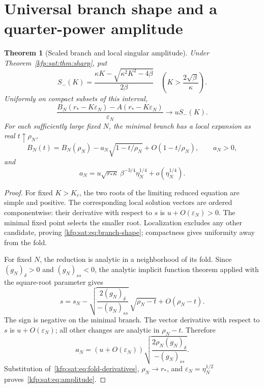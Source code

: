 \documentclass[11pt,a4paper]{article}
\newtheorem{theorem}{Theorem}[section]
\theoremstyle{definition}
\theoremstyle{remark}
\begin{document}
\section{Universal branch shape and a quarter-power amplitude}
\label{kfp:sat:sec:branch}

\begin{theorem}[Scaled branch and local singular amplitude]\label{kfp:sat:thm:branch}
Under Theorem~\ref{kfp:sat:thm:sharp}, put
\[
 S_-(K)=\frac{\kappa K-\sqrt{\kappa^2K^2-4\beta}}{2\beta}
 \quad\left(K>\frac{2\sqrt\beta}{\kappa}\right).
\]
Uniformly on compact subsets of this interval,
\begin{equation}\label{kfp:sat:eq:branch-shape}
 \frac{B_N(r_*-K\varepsilon_N)-A(r_*-K\varepsilon_N)}{\varepsilon_N}
 \longrightarrow uS_-(K).
\end{equation}
For each sufficiently large fixed $N$, the minimal branch has a local
expansion as real $t\uparrow\rho_N$,
\begin{equation}\label{kfp:sat:eq:local-sqrt}
 B_N(t)=B_N(\rho_N)-a_N\sqrt{1-t/\rho_N}
                  +O(1-t/\rho_N),\qquad a_N>0,
\end{equation}
and
\begin{equation}\label{kfp:sat:eq:amplitude}
 \boxed{\displaystyle
 a_N=u\sqrt{r_*\kappa}\,\beta^{-3/4}\eta_N^{1/4}
       +o(\eta_N^{1/4}).}
\end{equation}
\end{theorem}
\begin{proof}
For fixed $K>K_c$, the two roots of the limiting reduced equation are
simple and positive. The corresponding local solution vectors are ordered
componentwise: their derivative with respect to $s$ is
$u+O(\varepsilon_N)>0$. The minimal fixed point selects the smaller
root. Localization excludes any other candidate, proving
\eqref{kfp:sat:eq:branch-shape}; compactness gives uniformity away from the fold.

For fixed $N$, the reduction is analytic in a neighborhood of its fold.
Since $(g_N)_\delta>0$ and $(g_N)_{ss}<0$, the analytic implicit function
theorem applied with the square-root parameter gives
\[
 s=s_N-
 \sqrt{\frac{2(g_N)_\delta}{-(g_N)_{ss}}}\,
        \sqrt{\rho_N-t}+O(\rho_N-t).
\]
The sign is negative on the minimal branch. The vector derivative with
respect to $s$ is $u+O(\varepsilon_N)$; all other changes are analytic in
$\rho_N-t$. Therefore
\[
 a_N=(u+O(\varepsilon_N))
     \sqrt{\frac{2\rho_N(g_N)_\delta}{-(g_N)_{ss}}}.
\]
Substitution of~\eqref{kfp:sat:eq:fold-derivatives}, $\rho_N\to r_*$, and
$\varepsilon_N=\eta_N^{1/2}$ proves~\eqref{kfp:sat:eq:amplitude}.
\end{proof}
\end{document}
